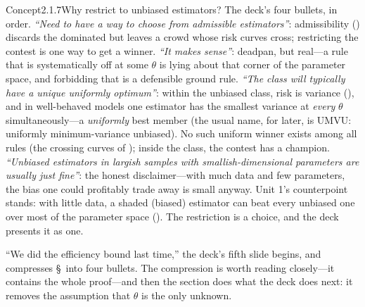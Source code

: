 \documentclass[main.tex]{subfiles}
\begin{document}
\begin{ObjL}{Concept}{2.1.7}{Why restrict to unbiased estimators?}
The deck's four bullets, in order. \emph{``Need to have a way to choose from admissible
estimators''}: admissibility () discards the dominated but leaves a crowd whose
risk curves cross; restricting the contest is one way to get a winner. \emph{``It makes
sense''}: deadpan, but real---a rule that is systematically off at some $\theta$ is lying
about that corner of the parameter space, and forbidding that is a defensible ground rule.
\emph{``The class will typically have a unique uniformly optimum''}: within the unbiased
class, risk is variance (), and in well-behaved models one estimator has the
smallest variance at \emph{every} $\theta$ simultaneously---a \emph{uniformly} best member
(the usual name, for later, is UMVU: uniformly minimum-variance unbiased). No such uniform
winner exists among all rules (the crossing curves of ); inside the class, the
contest has a champion. \emph{``Unbiased estimators in largish samples with
smallish-dimensional parameters are usually just fine''}: the honest disclaimer---with much
data and few parameters, the bias one could profitably trade away is small anyway. Unit 1's
counterpoint stands: with little data, a shaded (biased) estimator can beat every unbiased
one over most of the parameter space (). The restriction is a choice, and the
deck presents it as one.
\end{ObjL}


``We did the efficiency bound last time,'' the deck's fifth slide begins, and compresses
\S\, into four bullets. The compression is worth reading closely---it contains the
whole proof---and then the section does what the deck does next: it removes the assumption
that $\theta$ is the only unknown.
\end{document}
